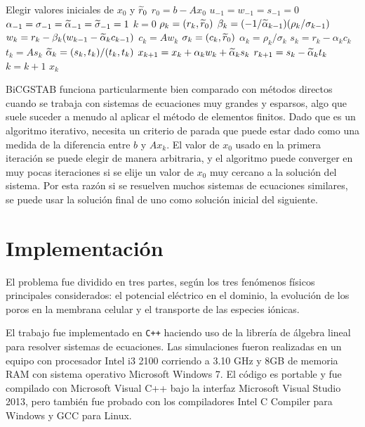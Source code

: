 \begin{algorithmic}
	\STATE Elegir valores iniciales de $x_0$ y $\widetilde{r}_0$
	\STATE $r_0 = b - A x_0$
	\STATE $u_{-1} = w_{-1} = s_{-1} = 0$
	\STATE $\alpha_{-1} = \sigma_{-1} = \widetilde{\alpha}_{-1} = \widetilde{\sigma}_{-1} = 1$
	\STATE $k = 0$
	\REPEAT
		\STATE $\rho_k = \left( r_k, \widetilde{r}_0 \right)$
		\STATE $\beta_k = (-1 / \widetilde{\alpha}_{k-1}) (\rho_k / \sigma_{k-1})$
		\STATE $w_k = r_k - \beta_k (w_{k-1} - \widetilde{\alpha}_{k} c_{k-1})$
		\STATE $c_k = A w_k$
		\STATE $\sigma_k = (c_k, \widetilde{r}_0)$
		\STATE $\alpha_k = \rho_k / \sigma_k$
		\STATE $s_k = r_k - \alpha_k c_k$
		\STATE $t_k = A s_k$ 
		\STATE $\widetilde{\alpha}_{k} = (s_k,t_k) / (t_k, t_k)$
		\STATE $x_{k+1} = x_k + \alpha_k w_k + \widetilde{\alpha}_{k} s_k$
		\STATE $r_{k+1} = s_k - \widetilde{\alpha}_{k} t_k$
		\STATE $k = k + 1$
	\RETURN $x_k$
\end{algorithmic}

BiCGSTAB funciona particularmente bien comparado con métodos directos cuando se trabaja con sistemas de ecuaciones muy grandes y esparsos, algo que suele suceder a menudo al aplicar el método de elementos finitos. Dado que es un algoritmo iterativo, necesita un criterio de parada que puede estar dado como una medida de la diferencia entre $b$ y $A x_k$. El valor de $x_0$ usado en la primera iteración se puede elegir de manera arbitraria, y el algoritmo puede converger en muy pocas iteraciones si se elije un valor de $x_0$ muy cercano a la solución del sistema. Por esta razón si se resuelven muchos sistemas de ecuaciones similares, se puede usar la solución final de uno como solución inicial del siguiente. 

\section{Implementación}
El problema fue dividido en tres partes, según los tres fenómenos físicos principales considerados: el potencial eléctrico en el dominio, la evolución de los poros en la membrana celular y el transporte de las especies iónicas. 

El trabajo fue implementado en \texttt{C++} haciendo uso de la librería de álgebra lineal  para resolver sistemas de ecuaciones. Las simulaciones fueron realizadas en un equipo con procesador Intel i3 2100 corriendo a 3.10 GHz y 8GB de memoria RAM con sistema operativo Microsoft Windows 7. El código es portable y fue compilado con Microsoft Visual C++ bajo la interfaz Microsoft Visual Studio 2013, pero también fue probado con los compiladores Intel C Compiler para Windows y GCC para Linux.

